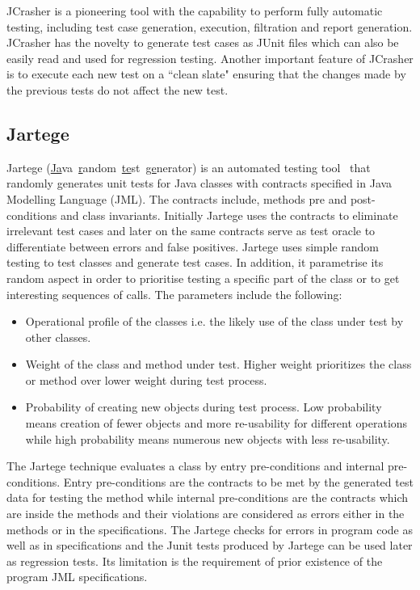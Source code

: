 JCrasher is a pioneering tool with the capability to perform fully automatic testing, including test case generation, execution, filtration and report generation. JCrasher has the novelty to generate test cases as JUnit files which can also be easily read and used for regression testing. Another important feature of JCrasher is to execute each new test on a ``clean slate" ensuring that the changes made by the previous tests do not affect the new test.  



\subsection{Jartege}
Jartege (\uline{Ja}va~\uline{r}andom~\uline{te}st~\uline{ge}nerator) is an automated testing tool~\cite{Oriat2004} that randomly generates unit tests for Java classes with contracts specified in Java Modelling Language (JML). The contracts include, methods pre and post-conditions and class invariants. Initially Jartege uses the contracts to eliminate irrelevant test cases and later on the same contracts serve as test oracle to differentiate between errors and false positives. Jartege uses simple random testing to test classes and generate test cases. In addition, it parametrise its random aspect in order to prioritise testing a specific part of the class or to get interesting sequences of calls. The parameters include the following: 
\begin{itemize}
\item Operational profile of the classes i.e. the likely use of the class under test by other classes.  
\item Weight of the class and method under test. Higher weight prioritizes the class or method over lower weight during test process. 
\item Probability of creating new objects during test process. Low probability means creation of fewer objects and more re-usability for different operations while high probability means numerous new objects with less re-usability.
\end{itemize}

The Jartege technique evaluates a class by entry pre-conditions and internal pre-conditions. Entry pre-conditions are the contracts to be met by the generated test data for testing the method while internal pre-conditions are the contracts which are inside the methods and their violations are considered as errors either in the methods or in the specifications. The Jartege checks for errors in program code as well as in specifications and the Junit tests produced by Jartege can be used later as regression tests. Its limitation is the requirement of prior existence of the program JML specifications.

